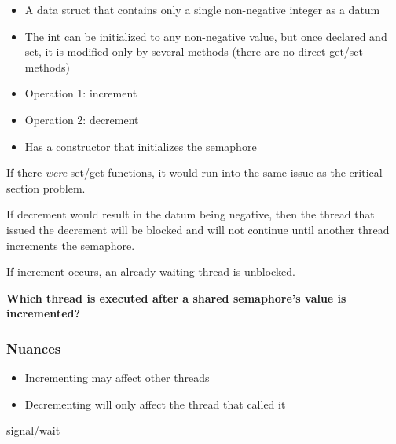 \documentclass{article}
\begin{document}
\begin{itemize}
    \item A data struct that contains only a single non-negative integer as a
          datum
    \item The int can be initialized to any non-negative value, but once
          declared and set, it is modified only by several methods (there are no
          direct get/set methods)
    \item Operation 1: increment
    \item Operation 2: decrement
    \item Has a constructor that initializes the semaphore
\end{itemize}

If there \emph{were} set/get functions, it would run into the same issue as the
critical section problem.

If decrement would result in the datum being negative, then the thread that
issued the decrement will be blocked and will not continue until another thread
increments the semaphore.

If increment occurs, an \underline{already} waiting thread is unblocked.

\textbf{Which thread is executed after a shared semaphore's value is incremented?}
\subsubsection*{Nuances}
\begin{itemize}
    \item Incrementing may affect other threads
    \item Decrementing will only affect the thread that called it
\end{itemize}

signal/wait
\end{document}
